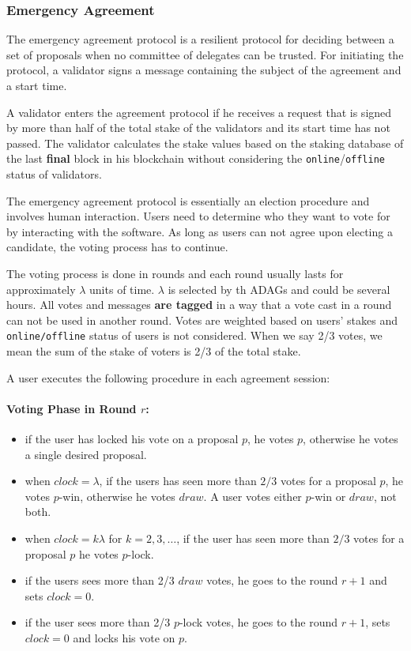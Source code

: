 \subsubsection{Emergency Agreement}

The emergency agreement protocol is a resilient protocol for deciding between a set of proposals when no committee of
delegates can be trusted. For initiating the protocol, a validator signs a message containing the subject
of the agreement and a start time.

A validator enters the agreement protocol if he
receives a request that is signed by more than half of the total stake
of the validators and its start time has not passed. The validator calculates
the stake values based on the staking database of the last \textbf{final} block in his blockchain without
considering the \texttt{online}/\texttt{offline} status of validators.

The emergency agreement protocol is essentially an election procedure and involves human interaction. Users need to
determine who they want to vote for by interacting with the software. As long as users can not agree upon electing a
candidate, the voting process has to continue.

The voting process is done in rounds and each round usually lasts for approximately $\lambda$ units of time.
$\lambda$ is selected by th ADAGs and could be several hours. All votes and messages \textbf{are tagged} in a way
that a vote cast in a round can not be used in another round. Votes are weighted based on users' stakes and
\texttt{online/offline} status of users is not considered. When we say 2/3 votes, we mean the sum of the stake of
voters is 2/3 of the total stake.

A user executes the following procedure in each agreement session:
\paragraph{Voting Phase in Round $r$:}
\begin{itemize}
    \item if the user has locked his vote on a proposal $p$, he votes $p$, otherwise he votes a single desired
    proposal.
    \item when $clock = \lambda$, if the users has seen more than $2/3$ votes for a proposal $p$, he votes $p$-win,
    otherwise he votes $draw$. A user votes either $p$-win or $draw$, not both.
    \item when $clock = k \lambda$ for $k=2,3,\dots$, if the user has seen more than $2/3$ votes for a proposal
    $p$ he votes $p$-lock.
    \item if the users sees more than 2/3 $draw$ votes, he goes to the round $r+1$ and sets $clock=0$.
    \item if the user sees more than 2/3 $p$-lock votes, he goes to the round $r+1$, sets $clock=0$ and locks his
    vote on $p$.
\end{itemize}

